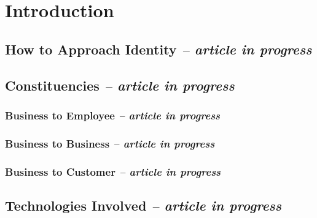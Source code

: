 \hypertarget{introduction}{%
\chapter{Introduction}\label{introduction}}

\hypertarget{how-to-approach-identity-article-in-progress}{%
\section{\texorpdfstring{How to Approach Identity \emph{-- article in
progress}}{How to Approach Identity -- article in progress}}\label{how-to-approach-identity-article-in-progress}}

\hypertarget{constituencies-article-in-progress}{%
\section{\texorpdfstring{Constituencies \emph{-- article in
progress}}{Constituencies -- article in progress}}\label{constituencies-article-in-progress}}

\hypertarget{business-to-employee-article-in-progress}{%
\subsection{\texorpdfstring{Business to Employee \emph{-- article in
progress}}{Business to Employee -- article in progress}}\label{business-to-employee-article-in-progress}}

\hypertarget{business-to-business-article-in-progress}{%
\subsection{\texorpdfstring{Business to Business \emph{-- article in
progress}}{Business to Business -- article in progress}}\label{business-to-business-article-in-progress}}

\hypertarget{business-to-customer-article-in-progress}{%
\subsection{\texorpdfstring{Business to Customer \emph{-- article in
progress}}{Business to Customer -- article in progress}}\label{business-to-customer-article-in-progress}}

\hypertarget{technologies-involved-article-in-progress}{%
\section{\texorpdfstring{Technologies Involved \emph{-- article in
progress}}{Technologies Involved -- article in progress}}\label{technologies-involved-article-in-progress}}

